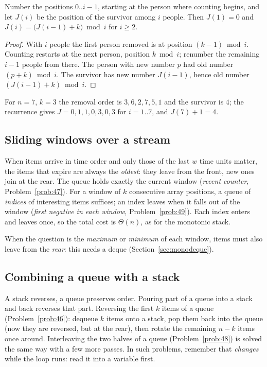 
\begin{proposition}
Number the positions $0..i-1$, starting at the person where counting begins, and let
$J(i)$ be the position of the survivor among $i$ people. Then $J(1)=0$ and
$J(i)=\bigl(J(i-1)+k\bigr)\bmod i$ for $i\ge2$.
\end{proposition}
\begin{proof}
With $i$ people the first person removed is at position $(k-1)\bmod i$. Counting
restarts at the next person, position $k\bmod i$; renumber the remaining $i-1$ people
from there. The person with new number $p$ had old number $(p+k)\bmod i$. The survivor
has new number $J(i-1)$, hence old number $(J(i-1)+k)\bmod i$.
\end{proof}
For $n=7$, $k=3$ the removal order is $3,6,2,7,5,1$ and the survivor is $4$; the
recurrence gives $J=0,1,1,0,3,0,3$ for $i=1..7$, and $J(7)+1=4$.

\subsection{Sliding windows over a stream}

When items arrive in time order and only those of the last $w$ time units matter, the
items that expire are always the \emph{oldest}: they leave from the front, new ones join
at the rear. The queue holds exactly the current window (\emph{recent counter},
Problem~\ref{prob:47}). For a window of $k$ consecutive array positions, a queue of
\emph{indices} of interesting items suffices; an index leaves when it falls out of the
window (\emph{first negative in each window}, Problem~\ref{prob:49}). Each index enters
and leaves once, so the total cost is $\Theta(n)$, as for the monotonic stack.

When the question is the \emph{maximum} or \emph{minimum} of each window, items must
also leave from the \emph{rear}: this needs a deque (Section~\ref{sec:monodeque}).

\subsection{Combining a queue with a stack}

A stack reverses, a queue preserves order. Pouring part of a queue into a stack and back
reverses that part. Reversing the first $k$ items of a queue
(Problem~\ref{prob:46}): dequeue $k$ items onto a stack, pop them back into the queue
(now they are reversed, but at the rear), then rotate the remaining $n-k$ items once
around. Interleaving the two halves of a queue (Problem~\ref{prob:48}) is solved the
same way with a few more passes. In such problems, remember that 
\emph{changes} while the loop runs: read it into a variable first.

